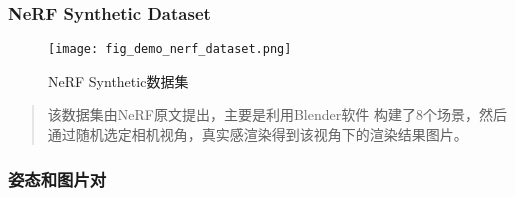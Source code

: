 \begin{frame}
\frametitle{NeRF Synthetic Dataset}
\begin{figure}[H]
    \texttt{[image: fig\_demo\_nerf\_dataset.png]}
    \caption[short]{NeRF Synthetic数据集}
\end{figure}
\begin{quote}
    该数据集由NeRF原文提出，主要是利用Blender软件
    构建了8个场景，然后通过随机选定相机视角，真实感渲染得到该视角下的渲染结果图片。
\end{quote}
\end{frame}

\begin{frame}
\frametitle{姿态和图片对}

\end{frame}
